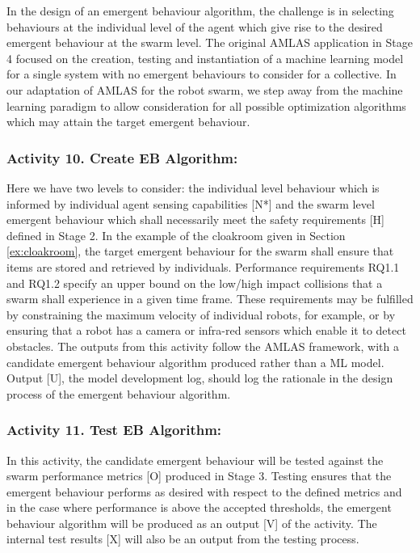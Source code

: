 \documentclass[lettersize,journal]{IEEEtran}
\begin{document}
In the design of an emergent behaviour algorithm, the challenge is in selecting behaviours at the individual level of the agent which give rise to the desired emergent behaviour at the swarm level. The original AMLAS application in Stage 4 focused on the creation, testing and instantiation of a machine learning model for a single system with no emergent behaviours to consider for a collective. In our adaptation of AMLAS for the robot swarm,  we step away from the machine learning paradigm to allow consideration for all possible optimization algorithms which may attain the target emergent behaviour.

\subsubsection*{Activity 10. Create EB Algorithm:}

Here we have two levels to consider: the individual level behaviour which is informed by individual agent sensing capabilities [N*] and the swarm level emergent behaviour which shall necessarily meet the safety requirements [H] defined in Stage 2. In the example of the cloakroom given in Section \ref{ex:cloakroom}, the target emergent behaviour for the swarm shall ensure that items are stored and retrieved by individuals. Performance requirements RQ1.1 and RQ1.2 specify an upper bound on the low/high impact collisions that a swarm shall experience in a given time frame. These requirements may be fulfilled by constraining the maximum velocity of individual robots, for example, or by ensuring that a robot has a camera or infra-red sensors which enable it to detect obstacles. The outputs from this activity follow the AMLAS framework, with a candidate emergent behaviour algorithm produced rather than a ML model. Output [U], the model development log, should log the rationale in the design process of the emergent behaviour algorithm.

\subsubsection*{Activity 11. Test EB Algorithm:}

In this activity, the candidate emergent behaviour will be tested against the swarm performance metrics [O] produced in Stage 3. Testing ensures that the emergent behaviour performs as desired with respect to the defined metrics and in the case where performance is above the accepted thresholds, the emergent behaviour algorithm will be produced as an output [V] of the activity. The internal test results [X] will also be an output from the testing process.
\end{document}
